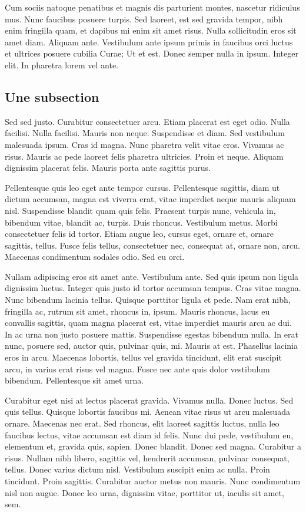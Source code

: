 \documentclass[../hdr.tex]{subfiles}
\begin{document}
Cum sociis natoque penatibus et magnis dis parturient montes, nascetur ridiculus
mus. Nunc faucibus posuere turpis. Sed laoreet, est sed gravida tempor, nibh
enim fringilla quam, et dapibus mi enim sit amet risus. Nulla sollicitudin eros
sit amet diam. Aliquam ante. Vestibulum ante ipsum primis in faucibus orci
luctus et ultrices posuere cubilia Curae; Ut et est. Donec semper nulla in
ipsum. Integer elit. In pharetra lorem vel ante.

\subsection*{Une subsection}

Sed sed justo. Curabitur consectetuer arcu. Etiam placerat est eget odio. Nulla
facilisi. Nulla facilisi. Mauris non neque. Suspendisse et diam. Sed vestibulum
malesuada ipsum. Cras id magna. Nunc pharetra velit vitae eros. Vivamus ac
risus. Mauris ac pede laoreet felis pharetra ultricies. Proin et neque. Aliquam
dignissim placerat felis. Mauris porta ante sagittis purus.

Pellentesque quis leo eget ante tempor cursus. Pellentesque sagittis, diam ut
dictum accumsan, magna est viverra erat, vitae imperdiet neque mauris aliquam
nisl. Suspendisse blandit quam quis felis. Praesent turpis nunc, vehicula in,
bibendum vitae, blandit ac, turpis. Duis rhoncus. Vestibulum metus. Morbi
consectetuer felis id tortor. Etiam augue leo, cursus eget, ornare et, ornare
sagittis, tellus. Fusce felis tellus, consectetuer nec, consequat at, ornare
non, arcu. Maecenas condimentum sodales odio. Sed eu orci.

Nullam adipiscing eros sit amet ante. Vestibulum ante. Sed quis ipsum non ligula
dignissim luctus. Integer quis justo id tortor accumsan tempus. Cras vitae
magna. Nunc bibendum lacinia tellus. Quisque porttitor ligula et pede. Nam erat
nibh, fringilla ac, rutrum sit amet, rhoncus in, ipsum. Mauris rhoncus, lacus eu
convallis sagittis, quam magna placerat est, vitae imperdiet mauris arcu ac dui.
In ac urna non justo posuere mattis. Suspendisse egestas bibendum nulla. In erat
nunc, posuere sed, auctor quis, pulvinar quis, mi. Mauris at est. Phasellus
lacinia eros in arcu. Maecenas lobortis, tellus vel gravida tincidunt, elit erat
suscipit arcu, in varius erat risus vel magna. Fusce nec ante quis dolor
vestibulum bibendum. Pellentesque sit amet urna.

Curabitur eget nisi at lectus placerat gravida. Vivamus nulla. Donec luctus. Sed
quis tellus. Quisque lobortis faucibus mi. Aenean vitae risus ut arcu malesuada
ornare. Maecenas nec erat. Sed rhoncus, elit laoreet sagittis luctus, nulla leo
faucibus lectus, vitae accumsan est diam id felis. Nunc dui pede, vestibulum eu,
elementum et, gravida quis, sapien. Donec blandit. Donec sed magna. Curabitur a
risus. Nullam nibh libero, sagittis vel, hendrerit accumsan, pulvinar consequat,
tellus. Donec varius dictum nisl. Vestibulum suscipit enim ac nulla. Proin
tincidunt. Proin sagittis. Curabitur auctor metus non mauris. Nunc condimentum
nisl non augue. Donec leo urna, dignissim vitae, porttitor ut, iaculis sit amet,
sem.
\end{document}
